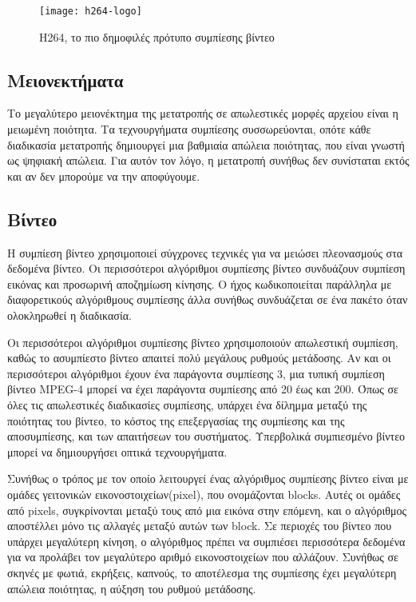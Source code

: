 \begin{figure}[h]
\centering
\texttt{[image: h264-logo]}
\caption{H264, το πιο δημοφιλές πρότυπο συμπίεσης βίντεο}
\end{figure}
\subsection{Μειονεκτήματα} 
Το μεγαλύτερο μειονέκτημα της μετατροπής σε απωλεστικές μορφές αρχείου είναι η μειωμένη ποιότητα. Τα τεχνουργήματα συμπίεσης συσσωρεύονται, οπότε κάθε διαδικασία μετατροπής δημιουργεί μια βαθμιαία απώλεια ποιότητας, που είναι γνωστή ως ψηφιακή απώλεια. Για αυτόν τον λόγο, η μετατροπή συνήθως δεν συνίσταται εκτός και αν δεν μπορούμε να την αποφύγουμε.

\subsection{Βίντεο}
H συμπίεση βίντεο χρησιμοποιεί σύγχρονες τεχνικές για να μειώσει πλεονασμούς στα δεδομένα βίντεο. Οι περισσότεροι αλγόριθμοι συμπίεσης βίντεο συνδυάζουν συμπίεση εικόνας και προσωρινή αποζημίωση κίνησης. Ο ήχος κωδικοποιείται παράλληλα με διαφορετικούς αλγόριθμους συμπίεσης άλλα συνήθως συνδυάζεται σε ένα πακέτο όταν ολοκληρωθεί η διαδικασία.

Οι περισσότεροι αλγόριθμοι συμπίεσης βίντεο χρησιμοποιούν απωλεστική συμπίεση, καθώς το ασυμπίεστο βίντεο απαιτεί πολύ μεγάλους ρυθμούς μετάδοσης. Αν και οι περισσότεροι αλγόριθμοι έχουν ένα παράγοντα συμπίεσης 3, μια τυπική συμπίεση βίντεο MPEG-4 μπορεί να έχει παράγοντα συμπίεσης από 20 έως και 200. Όπως σε όλες τις απωλεστικές διαδικασίες συμπίεσης, υπάρχει ένα δίλημμα μεταξύ της ποιότητας του βίντεο, το κόστος της επεξεργασίας της συμπίεσης και της αποσυμπίεσης, και των απαιτήσεων του συστήματος. Υπερβολικά συμπιεσμένο βίντεο μπορεί να δημιουργήσει οπτικά τεχνουργήματα.

Συνήθως ο τρόπος με τον οποίο λειτουργεί ένας αλγόριθμος συμπίεσης βίντεο είναι με ομάδες γειτονικών εικονοστοιχείων(pixel), που ονομάζονται blocks. Αυτές οι ομάδες από pixels, συγκρίνονται μεταξύ τους από μια εικόνα στην επόμενη, και ο αλγόριθμος αποστέλλει μόνο τις αλλαγές μεταξύ αυτών των block. Σε περιοχές του βίντεο που υπάρχει μεγαλύτερη κίνηση, ο αλγόριθμος πρέπει να συμπιέσει περισσότερα δεδομένα για να προλάβει τον μεγαλύτερο αριθμό εικονοστοιχείων που αλλάζουν. Συνήθως σε σκηνές με φωτιά, εκρήξεις, καπνούς, το αποτέλεσμα της συμπίεσης έχει μεγαλύτερη απώλεια ποιότητας, η αύξηση του ρυθμού μετάδοσης.


